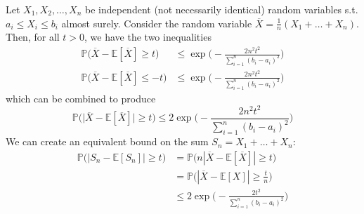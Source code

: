    \begin{theorem}
      Let $X_1, X_2, \ldots, X_n$ be independent (not necessarily identical) random variables s.t. $a_i \leq X_i \leq b_i$ almost surely. Consider the random variable $\overline{X} = \frac{1}{n} (X_1 + \ldots + X_n)$. Then, for all $t > 0$, we have the two inequalities
      \begin{align*}
        \mathbb{P}\big( \overline{X} - \mathbb{E}[\overline{X}] \geq t \big) & \leq \exp \bigg( -\frac{2 n^2 t^2}{\sum_{i=1}^n (b_i - a_i)^2} \bigg) \\
        \mathbb{P}\big( \overline{X} - \mathbb{E}[\overline{X}] \leq -t \big) & \leq \exp \bigg( -\frac{2 n^2 t^2}{\sum_{i=1}^n (b_i - a_i)^2} \bigg)
      \end{align*}
      which can be combined to produce 
      \begin{equation}
        \mathbb{P}\big( \big| \overline{X} - \mathbb{E}[\overline{X}] \big| \geq t \big) \leq 2 \exp \bigg( -\frac{2 n^2 t^2}{\sum_{i=1}^n (b_i - a_i)^2} \bigg)
      \end{equation}
      We can create an equivalent bound on the sum $S_n = X_1 + \ldots + X_n$: 
      \begin{align*}
        \mathbb{P}\big(| S_n - \mathbb{E}[S_n] | \geq t\big) & = \mathbb{P}\big( n |\overline{X} - \mathbb{E}[\overline{X}] | \geq t \big) \\
          & = \mathbb{P} \big( |\overline{X} - \mathbb{E}[X] | \geq \frac{t}{n} \big) \\
          & \leq 2 \exp \bigg( -\frac{2 t^2}{\sum_{i=1}^n (b_i - a_i)^2} \bigg) 
      \end{align*}
    \end{theorem}
